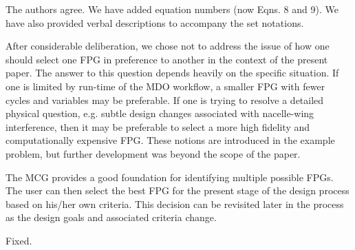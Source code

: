 \documentclass{article} %
\begin{document}

The authors agree.  We have added equation numbers (now Eqns. 8 and 9). We have also provided verbal descriptions to accompany the set notations.



After considerable deliberation, we chose not to address the issue of how one should select one FPG in preference to another  in the context of the present paper. The answer
to this question depends heavily on the specific situation. If one is limited by run-time of the MDO workflow,
a smaller FPG with fewer cycles and variables may be preferable. If one is trying to resolve a detailed physical question, e.g. subtle design changes associated with nacelle-wing interference, then it may be preferable  to select a
more high fidelity and computationally expensive FPG. These notions are introduced in the example problem, but further development was beyond the scope of the paper.

The MCG provides a good foundation for identifying multiple possible FPGs. The user can then select the best FPG for the present stage of the design process based on his/her own criteria.  This decision can be revisited later in the process as the design goals and associated criteria change.


Fixed.
\end{document}
